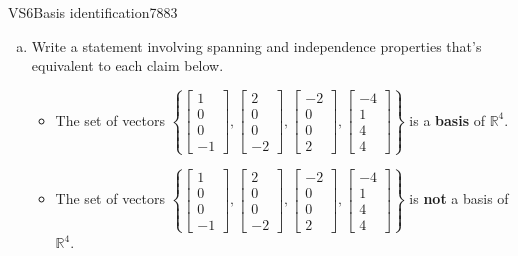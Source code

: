 \begin{exercise}{VS6}{Basis identification}{7883} 
\begin{exerciseStatement} 

\begin{enumerate}[(a)]
\item  

 Write a statement involving spanning and independence properties that's equivalent to each claim below. 

 

\begin{itemize}
\item  

 The set of vectors \(\left\{ \left[\begin{array}{c}
1 \\
0 \\
0 \\
-1
\end{array}\right] , \left[\begin{array}{c}
2 \\
0 \\
0 \\
-2
\end{array}\right] , \left[\begin{array}{c}
-2 \\
0 \\
0 \\
2
\end{array}\right] , \left[\begin{array}{c}
-4 \\
1 \\
4 \\
4
\end{array}\right] \right\}\) is a \textbf{basis} of \(\mathbb{R}^4\). 

 
\item  

 The set of vectors \(\left\{ \left[\begin{array}{c}
1 \\
0 \\
0 \\
-1
\end{array}\right] , \left[\begin{array}{c}
2 \\
0 \\
0 \\
-2
\end{array}\right] , \left[\begin{array}{c}
-2 \\
0 \\
0 \\
2
\end{array}\right] , \left[\begin{array}{c}
-4 \\
1 \\
4 \\
4
\end{array}\right] \right\}\) is \textbf{not} a basis of \(\mathbb{R}^4\). 


\end{itemize}
\end{enumerate}
\end{exerciseStatement}
\end{exercise}
